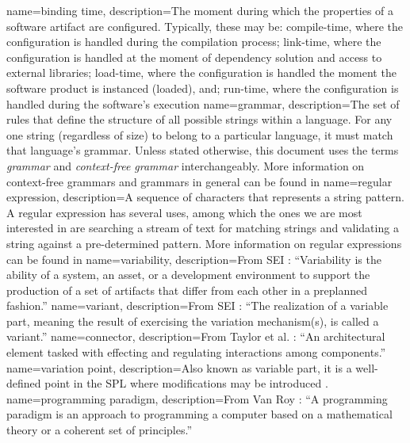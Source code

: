 {
	name={binding time},
	description={The moment during which the properties of a software artifact are configured. Typically, these may be: compile-time, where the configuration is handled during the compilation process; link-time, where the configuration is handled at the moment of dependency solution and access to external libraries; load-time, where the configuration is handled the moment the software product is instanced (loaded), and; run-time, where the configuration is handled during the software's execution}
}
{
	name={grammar},
	description={The set of rules that define the structure of all possible strings within a language. For any one string (regardless of size) to belong to a particular language, it must match that language's grammar. Unless stated otherwise, this document uses the terms \emph{grammar} and \emph{context-free grammar} interchangeably. More information on context-free grammars and grammars in general can be found in \cite{HOPCROFT:2000}}
}
{
	name={regular expression},
	description={A sequence of characters that represents a string pattern. A regular expression has several uses, among which the ones we are most interested in are searching a stream of text for matching strings and validating a string against a pre-determined pattern. More information on regular expressions can be found in \cite{HOPCROFT:2000}}
}
{
	name={variability},
	description={From SEI \cite{BACHMANN:2005}: ``Variability is the ability of a system, an asset, or a development environment to support the production of a set of artifacts that differ from each other in a preplanned fashion.''}
}
{
	name={variant},
	description={From SEI \cite{BACHMANN:2005}: ``The realization of a variable part, meaning the result of exercising the variation mechanism(s), is called a variant.''}
}
{
	name={connector},
	description={From Taylor et al. \cite{TAYLOR:2009}: ``An architectural element tasked with effecting and regulating interactions among components.''}
}
{
	name={variation point},
	description={Also known as variable part, it is a well-defined point in the SPL where modifications may be introduced \cite{BACHMANN:2005}.}
}
{
	name={programming paradigm},
	description={From Van Roy \cite{VANROY:2009}: ``A programming paradigm is an approach to programming a computer based on a mathematical theory or a coherent set of principles.''}
}
